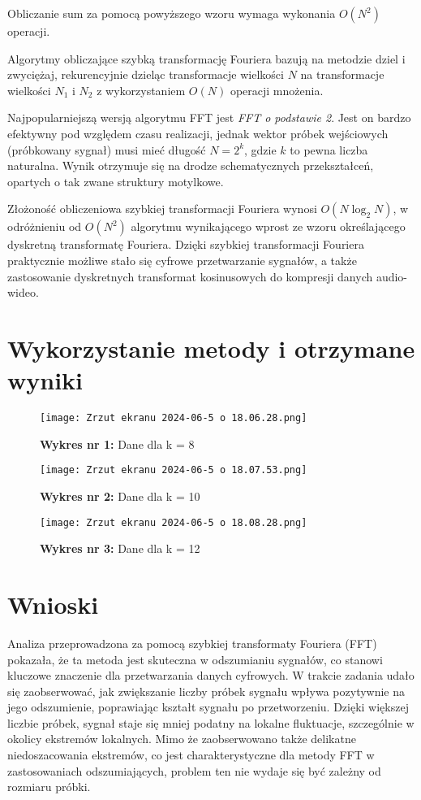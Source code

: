 \documentclass{article}
\begin{document}
\noindent
Obliczanie sum za pomocą powyższego wzoru wymaga wykonania \(O(N^2)\) operacji.

\noindent
Algorytmy obliczające szybką transformację Fouriera bazują na metodzie dziel i zwyciężaj, rekurencyjnie dzieląc transformacje wielkości \(N\) na transformacje wielkości \(N_1\) i \(N_2\) z wykorzystaniem \(O(N)\) operacji mnożenia.

\noindent
Najpopularniejszą wersją algorytmu FFT jest \textit{FFT o podstawie 2}. Jest on bardzo efektywny pod względem czasu realizacji, jednak wektor próbek wejściowych (próbkowany sygnał) musi mieć długość \(N = 2^k\), gdzie \(k\) to pewna liczba naturalna. Wynik otrzymuje się na drodze schematycznych przekształceń, opartych o tak zwane struktury motylkowe.

\noindent
Złożoność obliczeniowa szybkiej transformacji Fouriera wynosi \(O(N \log_2 N)\), w odróżnieniu od \(O(N^2)\) algorytmu wynikającego wprost ze wzoru określającego dyskretną transformatę Fouriera. Dzięki szybkiej transformacji Fouriera praktycznie możliwe stało się cyfrowe przetwarzanie sygnałów, a także zastosowanie dyskretnych transformat kosinusowych do kompresji danych audio-wideo.

\section{Wykorzystanie metody i otrzymane wyniki} 

\begin{figure}[H]
    \centering
    \texttt{[image: Zrzut ekranu 2024-06-5 o 18.06.28.png]}
    \caption{\textbf{Wykres nr 1:} Dane dla k = 8}
    \label{fig:enter-label}
\end{figure}

\begin{figure}[H]
    \centering
    \texttt{[image: Zrzut ekranu 2024-06-5 o 18.07.53.png]}
    \caption{\textbf{Wykres nr 2:} Dane dla k = 10}
    \label{fig:enter-label}
\end{figure}

\begin{figure}[H]
    \centering
    \texttt{[image: Zrzut ekranu 2024-06-5 o 18.08.28.png]}
    \caption{\textbf{Wykres nr 3: }Dane dla k = 12}
    \label{fig:enter-label}
\end{figure}

\newpage
\section{Wnioski}
Analiza przeprowadzona za pomocą szybkiej transformaty Fouriera (FFT) pokazała, że ta metoda jest skuteczna w odszumianiu sygnałów, co stanowi kluczowe znaczenie dla przetwarzania danych cyfrowych. W trakcie zadania udało się zaobserwować, jak zwiększanie liczby próbek sygnału wpływa pozytywnie na jego odszumienie, poprawiając kształt sygnału po przetworzeniu. Dzięki większej liczbie próbek, sygnał staje się mniej podatny na lokalne fluktuacje, szczególnie w okolicy ekstremów lokalnych. Mimo że zaobserwowano także delikatne niedoszacowania ekstremów, co jest charakterystyczne dla metody FFT w zastosowaniach odszumiających, problem ten nie wydaje się być zależny od rozmiaru próbki.
\end{document}
